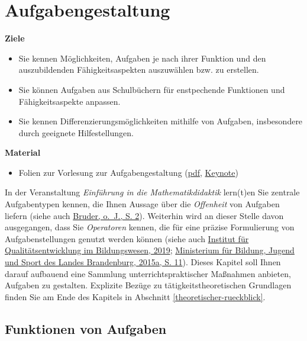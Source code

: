 \documentclass[
]{scrbook}
\providecommand{\tightlist}{%
  \setlength{\itemsep}{0pt}\setlength{\parskip}{0pt}}
\renewenvironment{quote}{
  \list{}{
	\leftmargin0.2cm   %
    \rightmargin\leftmargin
      	\def\FrameCommand
    {%
        {\color{quoteColor}\vrule width 2pt}%
        \hspace{0pt}%
    }%
    \MakeFramed{\advance \hsize -\width \FrameRestore}    \color{quoteColor}
    }
  \item\relax
}
{\endlist\color{black}\endMakeFramed}
\theoremstyle{definition}
\theoremstyle{definition}
\theoremstyle{definition}
\theoremstyle{definition}
\theoremstyle{remark}
\begin{document}
\hypertarget{aufgabengestaltung}{%
\chapter{Aufgabengestaltung}\label{aufgabengestaltung}}

\begin{quote}
\textbf{Ziele}

\begin{itemize}
\tightlist
\item
  Sie kennen Möglichkeiten, Aufgaben je nach ihrer Funktion und den auszubildenden Fähigkeitsaspekten auszuwählen bzw. zu erstellen.
\item
  Sie können Aufgaben aus Schulbüchern für enstpechende Funktionen und Fähigkeitsaspekte anpassen.
\item
  Sie kennen Differenzierungsmöglichkeiten mithilfe von Aufgaben, insbesondere durch geeignete Hilfestellungen.
\end{itemize}

\textbf{Material}

\begin{itemize}
\tightlist
\item
  Folien zur Vorlesung zur Aufgabengestaltung (\href{files/Stoffdidaktik-WiSe2223-Kap8.pdf}{pdf}, \href{files/Stoffdidaktik-WiSe2223-Kap8.key}{Keynote})
\end{itemize}
\end{quote}

In der Veranstaltung \emph{Einführung in die Mathematikdidaktik} lern(t)en Sie zentrale Aufgabentypen kennen, die Ihnen Aussage über die \emph{Offenheit} von Aufgaben liefern (siehe auch \protect\hyperlink{ref-Bruder}{Bruder, o.~J., S. 2}). Weiterhin wird an dieser Stelle davon ausgegangen, dass Sie \emph{Operatoren} kennen, die für eine präzise Formulierung von Aufgabenstellungen genutzt werden können (siehe auch \protect\hyperlink{ref-InstitutfurQualitatsentwicklungimBildungswesen2019}{Institut für Qualitätsentwicklung im Bildungswesen, 2019}; \protect\hyperlink{ref-MinisteriumfurBildungJugendundSportdesLandesBrandenburg}{Ministerium für Bildung, Jugend und Sport des Landes Brandenburg, 2015a, S. 11}). Dieses Kapitel soll Ihnen darauf aufbauend eine Sammlung unterrichtspraktischer Maßnahmen anbieten, Aufgaben zu gestalten. Explizite Bezüge zu tätigkeitstheoretischen Grundlagen finden Sie am Ende des Kapitels in Abschnitt \ref{theoretischer-rueckblick}.

\hypertarget{funktionen-von-aufgaben}{%
\section{Funktionen von Aufgaben}\label{funktionen-von-aufgaben}}
\end{document}

